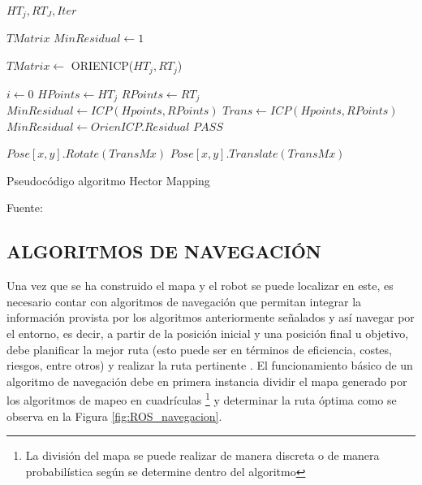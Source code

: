\begin{algorithm}[H]
\centering
    \begin{algorithmic}[1]
        \Require $HT_j, RT_J, Iter$
        
        \Ensure $TMatrix$
        \vspace{1mm}
        \hline
        \vspace{1mm}
        \State $MinResidual \leftarrow 1$

                \State $TMatrix \leftarrow$ ORIENICP($HT_j, RT_j$)
            \EndWhile
        \EndFunction
        
            \State $i \leftarrow 0$
            \State $HPoints \leftarrow HT_j$
            \State $RPoints \leftarrow RT_j$
            \State $MinResidual \leftarrow ICP(Hpoints, RPoints)$
                \State $Trans \leftarrow ICP(Hpoints, RPoints)$
                \State $MinResidual \leftarrow OrienICP.Residual$
                \State {}
            \Else
                \State $PASS$
           \EndIf
        \EndFunction
        
            \State \hspace{4mm} $Pose[x,y].Rotate(TransMx)$
            \State \hspace{4mm} $Pose[x,y].Translate(TransMx)$
            
        \EndFunction
        \vspace{1mm}
        \hline
        \vspace{1mm}
    \end{algorithmic}
\caption{Pseudocódigo algoritmo Hector Mapping}
Fuente: \cite{kohlbrecher_flexible_2011}
\label{alg:Algoritmo Hector Mapping}
\end{algorithm}

\newpage
\subsection{ALGORITMOS DE NAVEGACIÓN}

Una vez que se ha construido el mapa y el robot se puede localizar en este, es necesario contar con algoritmos de navegación que permitan integrar la información provista por los algoritmos anteriormente señalados y así navegar por el entorno, es decir, a partir de la posición inicial y una posición final u objetivo, debe planificar la mejor ruta (esto puede ser en términos de eficiencia, costes, riesgos, entre otros) y realizar la ruta pertinente \cite{gul_comprehensive_2019}. El funcionamiento básico de un algoritmo de navegación debe en primera instancia dividir el mapa generado por los algoritmos de mapeo en cuadrículas \footnote{La división del mapa se puede realizar de manera discreta o de manera probabilística según se determine dentro del algoritmo} y determinar la ruta óptima como se observa en la Figura \ref{fig:ROS_navegacion}.

